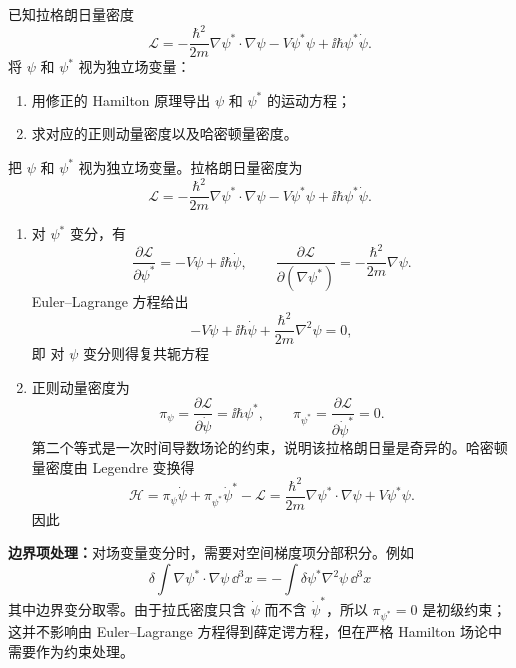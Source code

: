 \begin{question}[薛定谔场的拉格朗日量密度]
已知拉格朗日量密度
\[
  \mathcal{L}
  =-\frac{\hbar^2}{2m}\nabla\psi^*\cdot\nabla\psi
   -V\psi^*\psi+\ii\hbar\psi^*\dot\psi.
\]
将 $\psi$ 和 $\psi^*$ 视为独立场变量：
\begin{enumerate}
  \item 用修正的 Hamilton 原理导出 $\psi$ 和 $\psi^*$ 的运动方程；
  \item 求对应的正则动量密度以及哈密顿量密度。
\end{enumerate}

\begin{solution}
把 $\psi$ 和 $\psi^*$ 视为独立场变量。拉格朗日量密度为
\[
  \mathcal L=-\frac{\hbar^2}{2m}\nabla\psi^*\cdot\nabla\psi
  -V\psi^*\psi+\ii\hbar\psi^*\dot\psi .
\]
\begin{enumerate}
  \item 对 $\psi^*$ 变分，有
  \[
    \frac{\partial\mathcal L}{\partial\psi^*}
    =-V\psi+\ii\hbar\dot\psi,
    \qquad
    \frac{\partial\mathcal L}{\partial(\nabla\psi^*)}
    =-\frac{\hbar^2}{2m}\nabla\psi .
  \]
  Euler--Lagrange 方程给出
  \[
    -V\psi+\ii\hbar\dot\psi
    +\frac{\hbar^2}{2m}\nabla^2\psi=0,
  \]
  即
  对 $\psi$ 变分则得复共轭方程
  \item 正则动量密度为
  \[
    \pi_\psi=\frac{\partial\mathcal L}{\partial\dot\psi}=\ii\hbar\psi^*,
    \qquad
    \pi_{\psi^*}=\frac{\partial\mathcal L}{\partial\dot\psi^*}=0.
  \]
  第二个等式是一次时间导数场论的约束，说明该拉格朗日量是奇异的。哈密顿量密度由 Legendre 变换得
  \[
    \mathcal H=\pi_\psi\dot\psi+\pi_{\psi^*}\dot\psi^*-\mathcal L
    =\frac{\hbar^2}{2m}\nabla\psi^*\cdot\nabla\psi+V\psi^*\psi .
  \]
  因此
\end{enumerate}


\medskip
\textbf{边界项处理：}对场变量变分时，需要对空间梯度项分部积分。例如
\[
  \delta\int \nabla\psi^*\cdot\nabla\psi\,\dd^3x
  =-\int \delta\psi^*\nabla^2\psi\,\dd^3x
\]
其中边界变分取零。由于拉氏密度只含 $\dot\psi$ 而不含 $\dot\psi^*$，所以 $\pi_{\psi^*}=0$ 是初级约束；这并不影响由 Euler--Lagrange 方程得到薛定谔方程，但在严格 Hamilton 场论中需要作为约束处理。
\end{solution}

\end{question}
